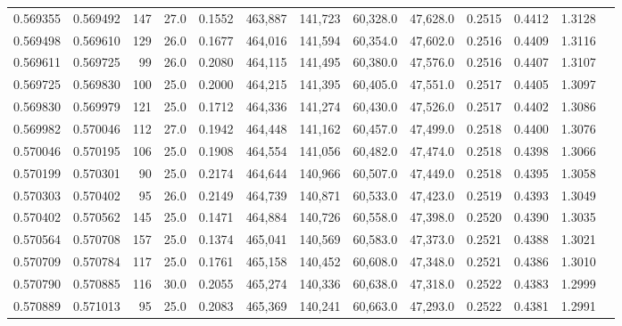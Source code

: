 \begin{tabular}{rrrrrrrrrrrrr}
0.569355 & 0.569492 &   147 & 27.0 &                                     0.1552 & 463,887 & 141,723 &  60,328.0 &  47,628.0 & 0.2515 & 0.4412 & 1.3128 \\
0.569498 & 0.569610 &   129 & 26.0 &                                     0.1677 & 464,016 & 141,594 &  60,354.0 &  47,602.0 & 0.2516 & 0.4409 & 1.3116 \\
0.569611 & 0.569725 &    99 & 26.0 &                                     0.2080 & 464,115 & 141,495 &  60,380.0 &  47,576.0 & 0.2516 & 0.4407 & 1.3107 \\
0.569725 & 0.569830 &   100 & 25.0 &                                     0.2000 & 464,215 & 141,395 &  60,405.0 &  47,551.0 & 0.2517 & 0.4405 & 1.3097 \\
0.569830 & 0.569979 &   121 & 25.0 &                                     0.1712 & 464,336 & 141,274 &  60,430.0 &  47,526.0 & 0.2517 & 0.4402 & 1.3086 \\
0.569982 & 0.570046 &   112 & 27.0 &                                     0.1942 & 464,448 & 141,162 &  60,457.0 &  47,499.0 & 0.2518 & 0.4400 & 1.3076 \\
0.570046 & 0.570195 &   106 & 25.0 &                                     0.1908 & 464,554 & 141,056 &  60,482.0 &  47,474.0 & 0.2518 & 0.4398 & 1.3066 \\
0.570199 & 0.570301 &    90 & 25.0 &                                     0.2174 & 464,644 & 140,966 &  60,507.0 &  47,449.0 & 0.2518 & 0.4395 & 1.3058 \\
0.570303 & 0.570402 &    95 & 26.0 &                                     0.2149 & 464,739 & 140,871 &  60,533.0 &  47,423.0 & 0.2519 & 0.4393 & 1.3049 \\
0.570402 & 0.570562 &   145 & 25.0 &                                     0.1471 & 464,884 & 140,726 &  60,558.0 &  47,398.0 & 0.2520 & 0.4390 & 1.3035 \\
0.570564 & 0.570708 &   157 & 25.0 &                                     0.1374 & 465,041 & 140,569 &  60,583.0 &  47,373.0 & 0.2521 & 0.4388 & 1.3021 \\
0.570709 & 0.570784 &   117 & 25.0 &                                     0.1761 & 465,158 & 140,452 &  60,608.0 &  47,348.0 & 0.2521 & 0.4386 & 1.3010 \\
0.570790 & 0.570885 &   116 & 30.0 &                                     0.2055 & 465,274 & 140,336 &  60,638.0 &  47,318.0 & 0.2522 & 0.4383 & 1.2999 \\
0.570889 & 0.571013 &    95 & 25.0 &                                     0.2083 & 465,369 & 140,241 &  60,663.0 &  47,293.0 & 0.2522 & 0.4381 & 1.2991 \\

\end{tabular}
